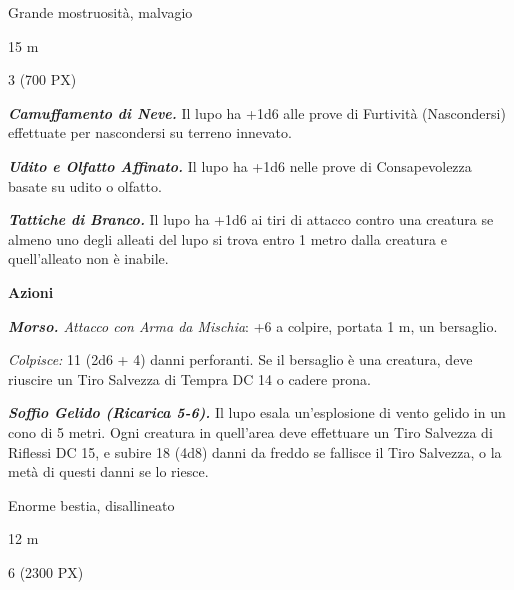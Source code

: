 \begin{multicols}{2}
{
\begin{description}[noitemsep, topsep=0pt, parsep=0pt, partopsep=0pt, itemsep=1pt, leftmargin=2.35cm,  labelwidth=2.2cm, itemindent=0cm, listparindent=0pt] %
\setlength{\baselineskip}{10pt}
\item[\textbf{Taglia/Tipo}] Grande mostruosità, malvagio
\item[\textbf{Caratt.}] 
\item[\textbf{Punti Ferita}] 
\item[\textbf{Tiri Salvez.}] 
\item[\textbf{Movimento}] 15 m
\item[\textbf{Sfida}] 3 (700 PX)
\end{description}
\smallskip

\emph{\textbf{Camuffamento di Neve.}} Il lupo ha +1d6 alle prove di Furtività (Nascondersi) effettuate per nascondersi su terreno innevato.

\emph{\textbf{Udito e Olfatto Affinato.}} Il lupo ha +1d6 nelle prove di Consapevolezza basate su udito o olfatto.

\emph{\textbf{Tattiche di Branco.}} Il lupo ha +1d6 ai tiri di attacco contro una creatura se almeno uno degli alleati del lupo si trova entro 1 metro dalla creatura e quell'alleato non è inabile.

\textbf{Azioni}

\emph{\textbf{Morso.} Attacco con Arma da Mischia}: +6 a colpire, portata 1 m, un bersaglio.

\emph{Colpisce:} 11 (2d6 + 4) danni perforanti. Se il bersaglio è una creatura, deve riuscire un Tiro Salvezza di Tempra DC 14 o cadere prona.

\emph{\textbf{Soffio Gelido (Ricarica 5-6).}} Il lupo esala un'esplosione di vento gelido in un cono di 5 metri. Ogni creatura in quell'area deve effettuare un Tiro Salvezza di Riflessi DC 15, e subire 18 (4d8) danni da freddo se fallisce il Tiro Salvezza, o la metà di questi danni se lo riesce.

\begin{description}[noitemsep, topsep=0pt, parsep=0pt, partopsep=0pt, itemsep=1pt, leftmargin=2.35cm,  labelwidth=2.2cm, itemindent=0cm, listparindent=0pt] %
\setlength{\baselineskip}{10pt}
\item[\textbf{Taglia/Tipo}] Enorme bestia, disallineato
\item[\textbf{Caratt.}] 
\item[\textbf{Punti Ferita}] 
\item[\textbf{Tiri Salvez.}] 
\item[\textbf{Movimento}] 12 m
\item[\textbf{Sfida}] 6 (2300 PX)
\end{description}
\smallskip

}
\end{multicols}
